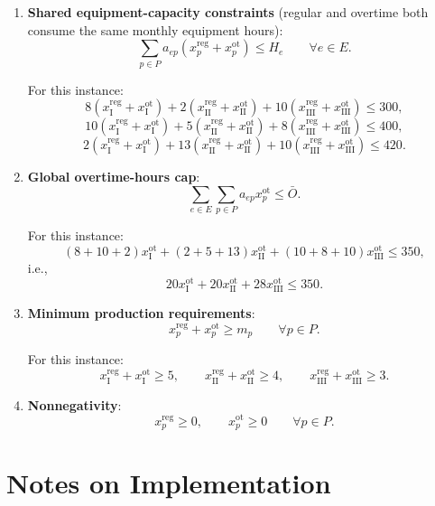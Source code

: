 \begin{enumerate}
    \item \textbf{Shared equipment-capacity constraints} (regular and overtime both consume the same monthly equipment hours):
    \[
    \sum_{p \in P} a_{ep}\left(x^{\mathrm{reg}}_p + x^{\mathrm{ot}}_p\right) \le H_e
    \qquad \forall e \in E.
    \]

    For this instance:
    \[
    8(x^{\mathrm{reg}}_{\mathrm{I}}+x^{\mathrm{ot}}_{\mathrm{I}})
    +2(x^{\mathrm{reg}}_{\mathrm{II}}+x^{\mathrm{ot}}_{\mathrm{II}})
    +10(x^{\mathrm{reg}}_{\mathrm{III}}+x^{\mathrm{ot}}_{\mathrm{III}})
    \le 300,
    \]
    \[
    10(x^{\mathrm{reg}}_{\mathrm{I}}+x^{\mathrm{ot}}_{\mathrm{I}})
    +5(x^{\mathrm{reg}}_{\mathrm{II}}+x^{\mathrm{ot}}_{\mathrm{II}})
    +8(x^{\mathrm{reg}}_{\mathrm{III}}+x^{\mathrm{ot}}_{\mathrm{III}})
    \le 400,
    \]
    \[
    2(x^{\mathrm{reg}}_{\mathrm{I}}+x^{\mathrm{ot}}_{\mathrm{I}})
    +13(x^{\mathrm{reg}}_{\mathrm{II}}+x^{\mathrm{ot}}_{\mathrm{II}})
    +10(x^{\mathrm{reg}}_{\mathrm{III}}+x^{\mathrm{ot}}_{\mathrm{III}})
    \le 420.
    \]

    \item \textbf{Global overtime-hours cap}:
    \[
    \sum_{e \in E}\sum_{p \in P} a_{ep}x^{\mathrm{ot}}_p \le \bar{O}.
    \]

    For this instance:
    \[
    (8+10+2)x^{\mathrm{ot}}_{\mathrm{I}}
    +(2+5+13)x^{\mathrm{ot}}_{\mathrm{II}}
    +(10+8+10)x^{\mathrm{ot}}_{\mathrm{III}}
    \le 350,
    \]
    i.e.,
    \[
    20x^{\mathrm{ot}}_{\mathrm{I}} + 20x^{\mathrm{ot}}_{\mathrm{II}} + 28x^{\mathrm{ot}}_{\mathrm{III}} \le 350.
    \]

    \item \textbf{Minimum production requirements}:
    \[
    x^{\mathrm{reg}}_p + x^{\mathrm{ot}}_p \ge m_p
    \qquad \forall p \in P.
    \]

    For this instance:
    \[
    x^{\mathrm{reg}}_{\mathrm{I}} + x^{\mathrm{ot}}_{\mathrm{I}} \ge 5,\qquad
    x^{\mathrm{reg}}_{\mathrm{II}} + x^{\mathrm{ot}}_{\mathrm{II}} \ge 4,\qquad
    x^{\mathrm{reg}}_{\mathrm{III}} + x^{\mathrm{ot}}_{\mathrm{III}} \ge 3.
    \]

    \item \textbf{Nonnegativity}:
    \[
    x^{\mathrm{reg}}_p \ge 0,\qquad x^{\mathrm{ot}}_p \ge 0
    \qquad \forall p \in P.
    \]
\end{enumerate}

\section*{Notes on Implementation}

